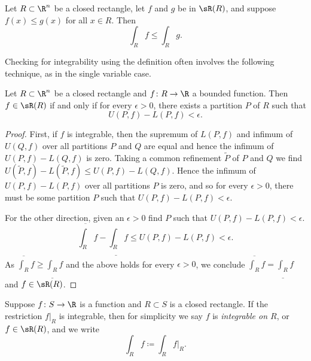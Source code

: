 \begin{prop}[Monotonicity]
Let $R \subset \R^n$ be a closed rectangle, let
$f$ and $g$ be in $\sR(R)$, and suppose $f(x) \leq g(x)$
for all $x \in R$.  Then
\begin{equation*}
\int_R f 
\leq
\int_R g .
\end{equation*}
\end{prop}

Checking for integrability using the definition often involves the following
technique, as in the single variable case.

\begin{prop} \label{mv:prop:upperlowerepsilon}
Let $R \subset \R^n$ be a closed rectangle and
$f \colon R \to \R$ a bounded function.
Then $f \in \sR(R)$ if and only if
for every $\epsilon > 0$, there exists a partition $P$ of $R$
such that
\begin{equation*}
U(P,f) - L(P,f) < \epsilon .
\end{equation*}
\end{prop}

\begin{proof}
First, if $f$ is integrable, then the supremum of $L(P,f)$ and
infimum of $U(Q,f)$ over all partitions $P$ and $Q$ are equal and hence the
infimum of $U(P,f)-L(Q,f)$ is zero.  Taking a common refinement
$\widetilde{P}$ of $P$ and $Q$ we find
$U(\widetilde{P},f)-L(\widetilde{P},f) \leq U(P,f)-L(Q,f)$.
Hence the infimum of $U(P,f)-L(P,f)$ over all partitions $P$ is zero, and
so for every $\epsilon > 0$, there must be some partition $P$ such that 
$U(P,f) - L(P,f) < \epsilon$.

For the other direction, given an $\epsilon > 0$ find $P$ such that
$U(P,f) - L(P,f) < \epsilon$.
\begin{equation*}
\overline{\int_R} f - 
\underline{\int_R} f 
\leq
U(P,f) - L(P,f)
< \epsilon .
\end{equation*}
As $\overline{\int_R} f \geq \underline{\int_R} f$ and the above holds for
every $\epsilon > 0$, we conclude 
$\overline{\int_R} f = \underline{\int_R} f$ and $f \in \sR(R)$.
\end{proof}

Suppose $f \colon S \to \R$ is a function and $R \subset S$
is a closed rectangle.  If the restriction $f|_R$ is integrable,
then for simplicity we
say $f$ is \emph{integrable on $R$}, or
$f \in \sR(R)$, and we
write
\begin{equation*}
\int_R f \coloneqq \int_R f|_R .
\end{equation*}

